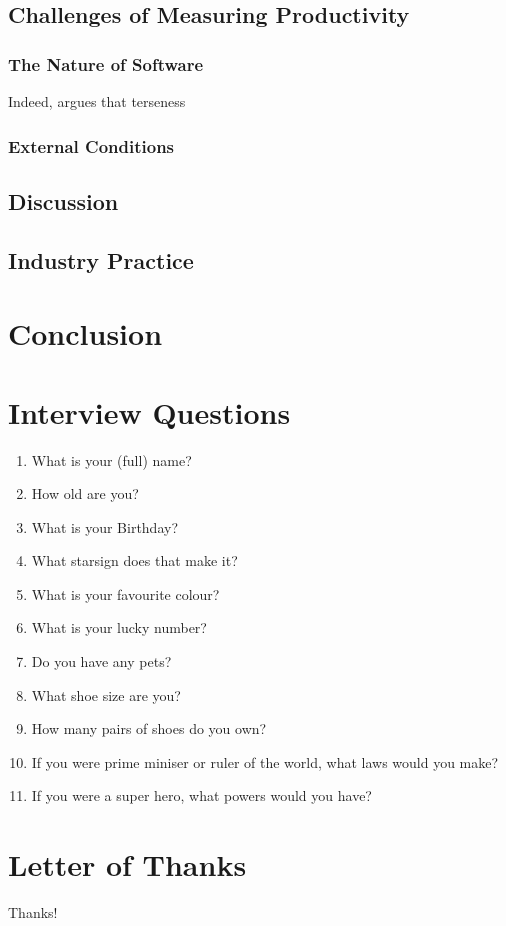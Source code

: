\documentclass[letterpaper, 12pt]{report}
\begin{document}
\section{Challenges of Measuring Productivity}
\subsection{The Nature of Software}
Indeed, \textcite{graham:succinctness} argues that terseness

\subsection{External Conditions}

\section{Discussion}
\begin{figure}
	
\end{figure}


\section{Industry Practice}

\chapter{Conclusion}

\appendix

\chapter{Interview Questions}
\begin{enumerate}[leftmargin=*]
	\item What is your (full) name?
	\item How old are you?
	\item What is your Birthday?
	\item What starsign does that make it?
	\item What is your favourite colour?
	\item What is your lucky number?
	\item Do you have any pets?
	\item What shoe size are you?
	\item How many pairs of shoes do you own?
	\item If you were prime miniser or ruler of the world, what laws would you make?
	\item If you were a super hero, what powers would you have?
\end{enumerate}

\chapter{Letter of Thanks}
Thanks!

% 
% 
\printbibliography
\end{document}
